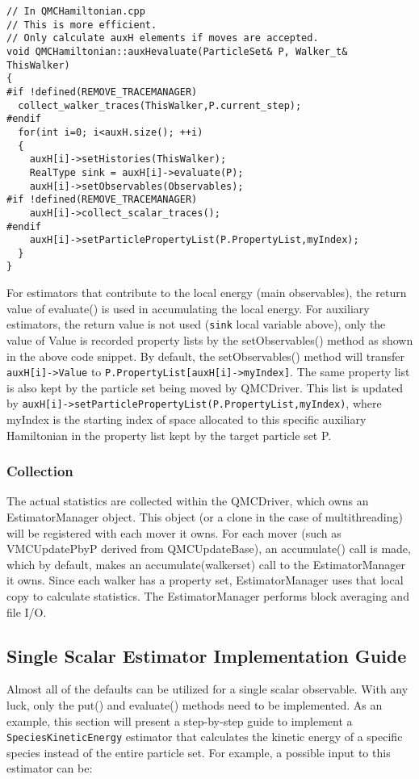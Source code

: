 \begin{lstlisting}[style=C++]
// In QMCHamiltonian.cpp
// This is more efficient. 
// Only calculate auxH elements if moves are accepted.
void QMCHamiltonian::auxHevaluate(ParticleSet& P, Walker_t& ThisWalker)
{
#if !defined(REMOVE_TRACEMANAGER)
  collect_walker_traces(ThisWalker,P.current_step);
#endif
  for(int i=0; i<auxH.size(); ++i)
  {
    auxH[i]->setHistories(ThisWalker);
    RealType sink = auxH[i]->evaluate(P);
    auxH[i]->setObservables(Observables);
#if !defined(REMOVE_TRACEMANAGER)
    auxH[i]->collect_scalar_traces();
#endif
    auxH[i]->setParticlePropertyList(P.PropertyList,myIndex);
  }
}
\end{lstlisting}

For estimators that contribute to the local energy (main observables), the return value of evaluate() is used in accumulating the local energy. For auxiliary estimators, the return value is not used (\verb|sink| local variable above), only the value of Value is recorded property lists by the setObservables() method as shown in the above code snippet. By default, the setObservables() method will transfer \verb|auxH[i]->Value| to \verb|P.PropertyList[auxH[i]->myIndex]|. The same property list is also kept by the particle set being moved by QMCDriver. This list is updated by \verb|auxH[i]->setParticlePropertyList(P.PropertyList,myIndex)|, where myIndex is the starting index of space allocated to this specific auxiliary Hamiltonian in the property list kept by the target particle set P.

\subsubsection{Collection}
The actual statistics are collected within the QMCDriver, which owns
an EstimatorManager object. This object (or a clone in the case of
multithreading) will be registered with each mover it owns. For each mover
(such as VMCUpdatePbyP derived from QMCUpdateBase), an accumulate() call
is made, which by default, makes an accumulate(walkerset) call to the
EstimatorManager it owns. Since each walker has a property set, EstimatorManager uses that local copy to calculate statistics. The EstimatorManager performs block averaging and file I/O.

\subsection{Single Scalar Estimator Implementation Guide}
Almost all of the defaults can be utilized for a single scalar observable. With any luck, only the put() and evaluate() methods need to be implemented. As an example, this section will present a step-by-step guide to implement a \verb|SpeciesKineticEnergy| estimator that calculates the kinetic energy of a specific species instead of the entire particle set. For example, a possible input to this estimator can be:

